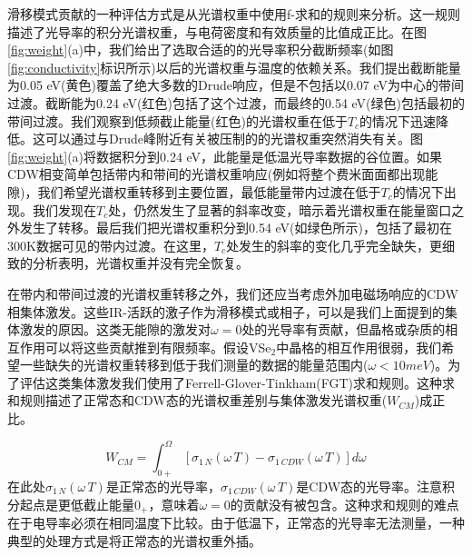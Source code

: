 \documentclass[reprint, aps, prb, showkeys]{revtex4-2}
\begin{document}
滑移模式贡献的一种评估方式是从光谱权重中使用f-求和的规则来分析。这一规则描述了光导率的积分光谱权重，与电荷密度和有效质量的比值成正比。在图\ref{fig:weight}(a)中，我们给出了选取合适的的光导率积分截断频率(如图\ref{fig:conductivity}标识所示)以后的光谱权重与温度的依赖关系。我们提出截断能量为0.05 eV(黄色)覆盖了绝大多数的Drude响应，但是不包括以0.07 eV为中心的带间过渡。截断能为0.24 eV(红色)包括了这个过渡，而最终的0.54 eV(绿色)包括最初的带间过渡。我们观察到低频截止能量(红色)的光谱权重在低于$T_c$的情况下迅速降低。这可以通过与Drude峰附近有关被压制的的光谱权重突然消失有关。图\ref{fig:weight}(a)将数据积分到0.24 eV，此能量是低温光导率数据的谷位置。如果CDW相变简单包括带内和带间的光谱权重响应(例如将整个费米面面都出现能隙)，我们希望光谱权重转移到主要位置，最低能量带内过渡在低于$T_c$的情况下出现。我们发现在$T_c$处，仍然发生了显著的斜率改变，暗示着光谱权重在能量窗口之外发生了转移。最后我们把光谱权重积分到0.54 eV(如绿色所示)，包括了最初在300K数据可见的带内过渡。在这里，$T_c$处发生的斜率的变化几乎完全缺失，更细致的分析表明，光谱权重并没有完全恢复。

在带内和带间过渡的光谱权重转移之外，我们还应当考虑外加电磁场响应的CDW相集体激发。这些IR-活跃的激子作为滑移模式或相子，可以是我们上面提到的集体激发的原因。这类无能隙的激发对$\omega = 0$处的光导率有贡献，但晶格或杂质的相互作用可以将这些贡献推到有限频率。假设VSe$_2$中晶格的相互作用很弱，我们希望一些缺失的光谱权重转移到低于我们测量的数据的能量范围内($\omega < 10 meV$)。为了评估这类集体激发我们使用了Ferrell-Glover-Tinkham(FGT)求和规则。这种求和规则描述了正常态和CDW态的光谱权重差别与集体激发光谱权重($W_{CM}$)成正比。

\begin{equation}
    W_{CM} = \int_{0+}^{\Omega}[ \sigma_{1\,N}(\omega\, T) - \sigma_{1\, CDW}(\omega\, T) ]d\omega
\end{equation}
在此处$\sigma_{1\,N}(\omega\, T)$是正常态的光导率，$\sigma_{1\, CDW}(\omega\, T)$是CDW态的光导率。注意积分起点是更低截止能量$0_{+}$，意味着$\omega = 0$的贡献没有被包含。这种求和规则的难点在于电导率必须在相同温度下比较。由于低温下，正常态的光导率无法测量，一种典型的处理方式是将正常态的光谱权重外插。
\end{document}
